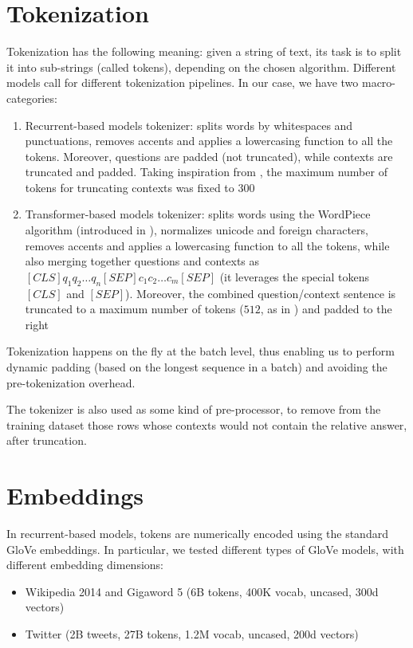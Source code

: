 \documentclass[a4paper,10pt]{report}
\begin{document}
\section{Tokenization}\label{sec:tokenization}
Tokenization has the following meaning: given a string of text, its task is to split it into sub-strings (called tokens), depending on the chosen algorithm. Different models call for different tokenization pipelines. In our case, we have two macro-categories:
\begin{enumerate}
  \item Recurrent-based models tokenizer: splits words by whitespaces and punctuations, removes accents and applies a lowercasing function to all the tokens. Moreover, questions are padded (not truncated), while contexts are truncated and padded. Taking inspiration from \cite{max-context-tokens}, the maximum number of tokens for truncating contexts was fixed to $300$
  \item Transformer-based models tokenizer: splits words using the WordPiece algorithm (introduced in \cite{wordpiece}), normalizes unicode and foreign characters, removes accents and applies a lowercasing function to all the tokens, while also merging together questions and contexts as $[CLS] q_1 q_2 \dots q_n [SEP] c_1 c_2 \dots c_m [SEP]$ (it leverages the special tokens $[CLS]$ and $[SEP]$). Moreover, the combined question/context sentence is truncated to a maximum number of tokens ($512$, as in \cite{bert}) and padded to the right
\end{enumerate}
Tokenization happens on the fly at the batch level, thus enabling us to perform dynamic padding (based on the longest sequence in a batch) and avoiding the pre-tokenization overhead.

The tokenizer is also used as some kind of pre-processor, to remove from the training dataset those rows whose contexts would not contain the relative answer, after truncation.

\section{Embeddings}\label{sec:embeddings}
In recurrent-based models, tokens are numerically encoded using the standard GloVe embeddings. In particular, we tested different types of GloVe models, with different embedding dimensions:
\begin{itemize}
  \item Wikipedia 2014 and Gigaword 5 (6B tokens, 400K vocab, uncased, 300d vectors)
  \item Twitter (2B tweets, 27B tokens, 1.2M vocab, uncased, 200d vectors)
\end{itemize}
\end{document}
